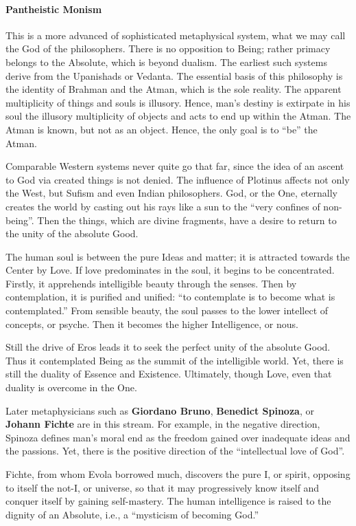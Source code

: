 \paragraph{Pantheistic Monism}


This is a more advanced of sophisticated metaphysical system, what we may call the God of the philosophers. There is no opposition to Being; rather primacy belongs to the Absolute, which is beyond dualism. The earliest such systems derive from the Upanishads or Vedanta. The essential basis of this philosophy is the identity of Brahman and the Atman, which is the sole reality. The apparent multiplicity of things and souls is illusory. Hence, man's destiny is extirpate in his soul the illusory multiplicity of objects and acts to end up within the Atman. The Atman is known, but not as an object. Hence, the only goal is to ``be'' the Atman.

Comparable Western systems never quite go that far, since the idea of an ascent to God via created things is not denied. The influence of Plotinus affects not only the West, but Sufism and even Indian philosophers. God, or the One, eternally creates the world by casting out his rays like a sun to the ``very confines of non-being''. Then the things, which are divine fragments, have a desire to return to the unity of the absolute Good.

The human soul is between the pure Ideas and matter; it is attracted towards the Center by Love. If love predominates in the soul, it begins to be concentrated. Firstly, it apprehends intelligible beauty through the senses. Then by contemplation, it is purified and unified: ``to contemplate is to become what is contemplated.'' From sensible beauty, the soul passes to the lower intellect of concepts, or psyche. Then it becomes the higher Intelligence, or nous.

Still the drive of Eros leads it to seek the perfect unity of the absolute Good. Thus it contemplated Being as the summit of the intelligible world. Yet, there is still the duality of Essence and Existence. Ultimately, though Love, even that duality is overcome in the One.

Later metaphysicians such as \textbf{Giordano Bruno}, \textbf{Benedict Spinoza}, or \textbf{Johann Fichte} are in this stream. For example, in the negative direction, Spinoza defines man's moral end as the freedom gained over inadequate ideas and the passions. Yet, there is the positive direction of the ``intellectual love of God''.

Fichte, from whom Evola borrowed much, discovers the pure I, or spirit, opposing to itself the not-I, or universe, so that it may progressively know itself and conquer itself by gaining self-mastery. The human intelligence is raised to the dignity of an Absolute, i.e., a ``mysticism of becoming God.''

